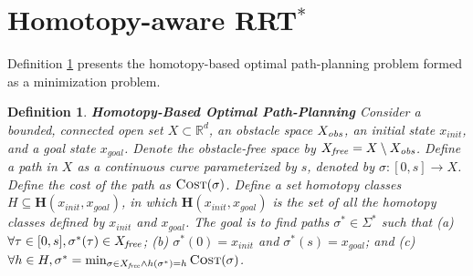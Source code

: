 \documentclass[letterpaper, 10 pt, conference]{ieeeconf}
\newtheorem{defn}{Definition}
\begin{document}
\section{Homotopy-aware RRT$^{*}$}
\label{sec:algorithm}

Definition \ref{def:homo_path_planning} presents the homotopy-based optimal path-planning problem formed as a minimization problem.
\begin{defn}{ \textbf{Homotopy-Based Optimal Path-Planning} }
\label{def:homo_path_planning}
Consider a bounded, connected open set $ X \subset \mathbb{R}^{d} $, an obstacle space $ X_{\it obs} $, an initial state $ x_{init} $, and a goal state $ x_{goal} $. 
Denote the obstacle-free space by $ X_{\it free} = X \setminus X_{\it obs} $.
Define a {\em path} in $X$ as a continuous curve parameterized by $s$, denoted by $\sigma : [0,s] \rightarrow X$. 
Define the cost of the path as $ \mbox{\sc Cost} (\sigma) $.  
Define a set homotopy classes $ H \subseteq \bm{H} ( x_{init}, x_{goal} ) $, in which $ \bm{H} ( x_{init}, x_{goal} ) $ is the set of all the homotopy classes defined by $ x_{init} $ and $ x_{goal} $.
The goal is to find paths $ \sigma^{*} \in \Sigma^{*}$ such that
\textit{ (a) } $ \forall \tau\in[0,s], \sigma^*(\tau) \in X_{\it free}$;
\textit{ (b) } $ \sigma^{*} (0) = x_{init} $ and $ \sigma^{*} (s) = x_{goal}  $; and
\textit{ (c) } $ \forall h \in H, \sigma^{*} = \min_{\sigma \in X_{\it free} \land h(\sigma^{*}) = h } \mbox{\sc Cost}  (\sigma) $. %
\end{defn} 
\end{document}
